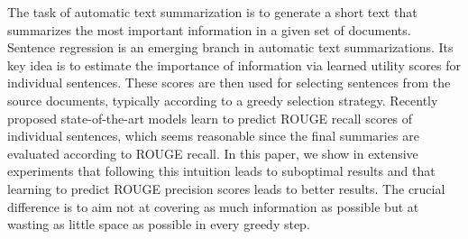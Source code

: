 The task of automatic text summarization is to generate a short text that summarizes the most important information in a given set of documents. Sentence regression is an emerging branch in automatic text summarizations. Its key idea is to estimate the importance of information via learned utility scores for individual sentences. These scores are then used for selecting sentences from the source documents, typically according to a greedy selection strategy. Recently proposed state-of-the-art models learn to predict ROUGE recall scores of individual sentences, which seems reasonable since the final summaries are evaluated according to ROUGE recall. In this paper, we show in extensive experiments that following this intuition leads to suboptimal results and that learning to predict ROUGE precision scores leads to better results. The crucial difference is to aim not at covering as much information as possible but at wasting as little space as possible in every greedy step.
